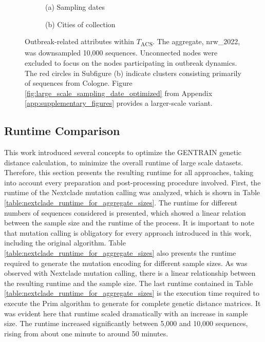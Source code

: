 \begin{figure}[H]
  \centering
    \par\vspace{1em} 
  \begin{subfigure}[b]{0.495\textwidth}
    
    \caption*{(a) Sampling dates}
  \end{subfigure}
  \begin{subfigure}[b]{0.495\textwidth}
    
    \caption*{(b) Cities of collection}
  \end{subfigure}
  \caption[Outbreak-related attributes within $T$\textsubscript{ACS}]{Outbreak-related attributes within $T$\textsubscript{ACS}. The aggregate, nrw\_2022, was downsampled 10,000 sequences. Unconnected nodes were excluded to focus on the nodes participating in outbreak dynamics. The red circles in Subfigure (b) indicate clusters consisting primarily of sequences from Cologne. Figure \ref{fig:large_scale_sampling_date_optimized} from Appendix \ref{app:supplementary_figures} provides a larger-scale variant.}
\label{fig:lsh_graphs_nrw_2022_outbreak_related_attributes}
\end{figure}

\subsection{Runtime Comparison}
\label{sec:runtime_comparison}
This work introduced several concepts to optimize the GENTRAIN genetic distance calculation, to minimize the overall runtime of large scale datasets. Therefore, this section presents the resulting runtime for all approaches, taking into account every preparation and post-processing procedure involved.
First, the runtime of the Nextclade mutation calling was analyzed, which is shown in Table \ref{table:nextclade_runtime_for_aggregate_sizes}. The runtime for different numbers of sequences considered is presented, which showed a linear relation between the sample size and the runtime of the process. It is important to note that mutation calling is obligatory for every approach introduced in this work, including the original algorithm.
Table \ref{table:nextclade_runtime_for_aggregate_sizes} also presents the runtime required to generate the mutation encoding for different sample sizes. As was observed with Nextclade mutation calling, there is a linear relationship between the resulting runtime and the sample size. The last runtime contained in Table \ref{table:nextclade_runtime_for_aggregate_sizes} is the execution time required to execute the Prim algorithm to generate  for complete genetic distance matrices. It was evident here that runtime scaled dramatically with an increase in sample size. The runtime increased significantly between 5,000 and 10,000 sequences, rising from about one minute to around 50 minutes.

